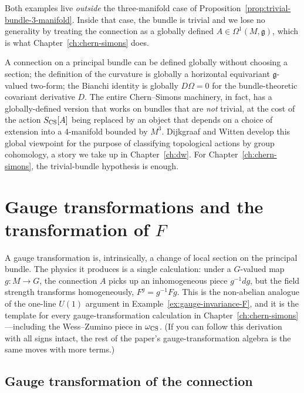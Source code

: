 \noindent Both examples live \emph{outside} the three-manifold case of Proposition~\ref{prop:trivial-bundle-3-manifold}. Inside that case, the bundle is trivial and we lose no generality by treating the connection as a globally defined $A \in \Omega^1(M, \mathfrak{g})$, which is what Chapter~\ref{ch:chern-simons} does.

\begin{remark}\label{rem:nakahara-pointer}
A connection on a principal bundle can be defined globally without choosing a section; the definition of the curvature is globally a horizontal equivariant $\mathfrak{g}$-valued two-form; the Bianchi identity is globally $D\Omega = 0$ for the bundle-theoretic covariant derivative $D$. The entire Chern--Simons machinery, in fact, has a globally-defined version that works on bundles that are \emph{not} trivial, at the cost of the action $S_{\operatorname{CS}}[A]$ being replaced by an object that depends on a choice of extension into a 4-manifold bounded by $M^3$. Dijkgraaf and Witten \cite{DijkgraafWitten1990} develop this global viewpoint for the purpose of classifying topological actions by group cohomology, a story we take up in Chapter~\ref{ch:dw}. For Chapter~\ref{ch:chern-simons}, the trivial-bundle hypothesis is enough.
\end{remark}


\section{Gauge transformations and the transformation of $F$}\label{sec:gauge-transf}

A gauge transformation is, intrinsically, a change of local section on the principal bundle. The physics it produces is a single calculation: under a $G$-valued map $g : M \to G$, the connection $A$ picks up an inhomogeneous piece $g^{-1}dg$, but the field strength transforms homogeneously, $F^g = g^{-1} F g$. This is the non-abelian analogue of the one-line $U(1)$ argument in Example~\ref{ex:gauge-invariance-F}, and it is the template for every gauge-transformation calculation in Chapter~\ref{ch:chern-simons}---including the Wess--Zumino piece in $\omega_{\operatorname{CS}}$.  (If you can follow this derivation with all signs intact, the rest of the paper's gauge-transformation algebra is the same moves with more terms.)

\subsection{Gauge transformation of the connection}

